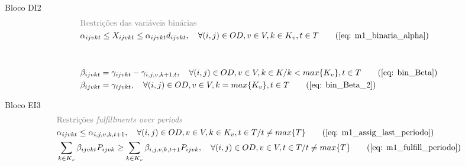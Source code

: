 	
\begin{bloque2}{Bloco \hypertarget{frase:DI2.1}{DI2} }
\allowdisplaybreaks
\begin{align}
	 & \textcolor{gray}{\text{Restrições das variáveis binárias}} \notag                                                                                                                                                  \\
	 & \alpha_{ijvkt} \leq X_{ijvkt} \leq \alpha_{ijvkt}d_{ijvkt}, \quad   \forall(i,j) \in OD, v \in V, k \in K_v, t \in T   \tag{\ref{eq: m1_binaria_alpha}}                                                                    \\
	 & \notag \\  \notag \\
	 & \beta_{ijvkt} = \gamma_{ijvkt} - \gamma_{i,j,v,k+1,t}, \quad \forall (i,j) \in OD, v \in V, k \in K /k < max\{K_v\}, t\in T  \tag{\ref{eq: bin_Beta}}                                                                      \\
	 & \beta_{ijvkt} = \gamma_{ijvkt}, \quad   \forall(i,j) \in OD, v \in V, k = max\{K_v\}, t \in T                            \tag{\ref{eq: bin_Beta_2}}                                                                       
\end{align}
\end{bloque2}



\begin{bloque3}{Bloco \hypertarget{frase:EI3.3}{EI3} }
\allowdisplaybreaks
\begin{align}
	& \textcolor{gray}{\text{Restrições \textit{fulfillments over periods}}} \notag																																				   \\
	 & \alpha_{ijvkt} \leq \alpha_{i,j,v,k,t+1}, \quad   \forall(i,j) \in OD, v \in V, k \in K_v, t \in T/ t \neq max\{T\}     \tag{\ref{eq: m1_assig_last_periodo}}                                                              \\
	 & \sum_{k \in K_v}\beta_{ijvkt}P_{ijvk} \geq \sum_{k \in K_v}\beta_{i,j,v,k,t+1}P_{ijvk},  \quad   \forall(i,j) \in OD, v \in V, t \in T/ t \neq max\{T\}   \tag{\ref{eq: m1_fulfill_periodo}}                               
\end{align}
\end{bloque3}



